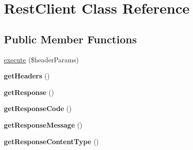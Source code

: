 \hypertarget{class_rest_client}{\section{Rest\+Client Class Reference}
\label{class_rest_client}
}
\subsection*{Public Member Functions}
\begin{DoxyCompactItemize}
\item 
\hyperlink{class_rest_client_a20c33fb8bc003f6474f3383716f0ac17}{execute} (\$header\+Params)
\item 
\hypertarget{class_rest_client_a157e0005d82edaa21cbea07fdc5c62da}{{\bfseries get\+Headers} ()}\label{class_rest_client_a157e0005d82edaa21cbea07fdc5c62da}

\item 
\hypertarget{class_rest_client_a6c907e8af775e517a77037dd0164222f}{{\bfseries get\+Response} ()}\label{class_rest_client_a6c907e8af775e517a77037dd0164222f}

\item 
\hypertarget{class_rest_client_a3716603c81e7656f46476ca4eeb09135}{{\bfseries get\+Response\+Code} ()}\label{class_rest_client_a3716603c81e7656f46476ca4eeb09135}

\item 
\hypertarget{class_rest_client_a0d5c764537841a1ae02b6364791d4540}{{\bfseries get\+Response\+Message} ()}\label{class_rest_client_a0d5c764537841a1ae02b6364791d4540}

\item 
\hypertarget{class_rest_client_ae31a227fe79482b22bc7404e9fb988e0}{{\bfseries get\+Response\+Content\+Type} ()}\label{class_rest_client_ae31a227fe79482b22bc7404e9fb988e0}


\end{DoxyCompactItemize}

